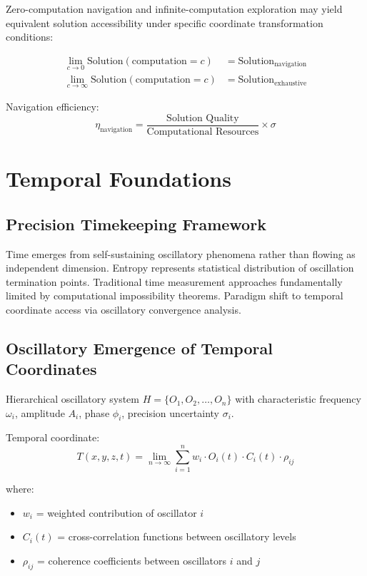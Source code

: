 \documentclass[12pt,a4paper]{article}
\begin{document}
Zero-computation navigation and infinite-computation exploration may yield equivalent solution accessibility under specific coordinate transformation conditions:

\begin{align}
\lim_{c \to 0} \text{Solution}(\text{computation} = c) &= \text{Solution}_{\text{navigation}}\\
\lim_{c \to \infty} \text{Solution}(\text{computation} = c) &= \text{Solution}_{\text{exhaustive}}
\end{align}

Navigation efficiency:
\begin{equation}
\eta_{\text{navigation}} = \frac{\text{Solution Quality}}{\text{Computational Resources}} \times \sigma
\end{equation}

\section{Temporal Foundations}

\subsection{Precision Timekeeping Framework}

Time emerges from self-sustaining oscillatory phenomena rather than flowing as independent dimension. Entropy represents statistical distribution of oscillation termination points. Traditional time measurement approaches fundamentally limited by computational impossibility theorems. Paradigm shift to temporal coordinate access via oscillatory convergence analysis.

\subsection{Oscillatory Emergence of Temporal Coordinates}

Hierarchical oscillatory system $H = \{O_1, O_2, \ldots, O_n\}$ with characteristic frequency $\omega_i$, amplitude $A_i$, phase $\phi_i$, precision uncertainty $\sigma_i$.

Temporal coordinate:
\begin{equation}
T(x,y,z,t) = \lim_{n \to \infty} \sum_{i=1}^{n} w_i \cdot O_i(t) \cdot C_i(t) \cdot \rho_{ij}
\end{equation}

where:
\begin{itemize}
\item $w_i$ = weighted contribution of oscillator $i$
\item $C_i(t)$ = cross-correlation functions between oscillatory levels
\item $\rho_{ij}$ = coherence coefficients between oscillators $i$ and $j$
\end{itemize}
\end{document}
